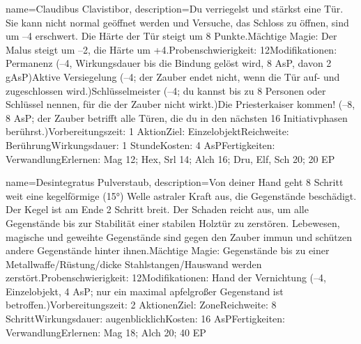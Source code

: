 {
    name={Claudibus Clavistibor},
    description={Du verriegelst und stärkst eine Tür. Sie kann nicht normal geöffnet werden und Versuche, das Schloss zu öffnen, sind um –4 erschwert. Die Härte der Tür steigt um 8 Punkte.\newline Mächtige Magie: Der Malus steigt um –2, die Härte um +4.\newline Probenschwierigkeit: 12\newline Modifikationen: Permanenz (–4, Wirkungsdauer bis die Bindung gelöst wird, 8 AsP, davon 2 gAsP)\newline Aktive Versiegelung (–4; der Zauber endet nicht, wenn die Tür auf- und zugeschlossen wird.)\newline Schlüsselmeister (–4; du kannst bis zu 8 Personen oder Schlüssel nennen, für die der Zauber nicht wirkt.)\newline Die Priesterkaiser kommen! (–8, 8 AsP; der Zauber betrifft alle Türen, die du in den nächsten 16 Initiativphasen berührst.)\newline Vorbereitungszeit: 1 Aktion\newline Ziel: Einzelobjekt\newline Reichweite: Berührung\newline Wirkungsdauer: 1 Stunde\newline Kosten: 4 AsP\newline Fertigkeiten: Verwandlung\newline Erlernen: Mag 12; Hex, Srl 14; Alch 16; Dru, Elf, Sch 20; 20 EP}
}


{
    name={Desintegratus Pulverstaub},
    description={Von deiner Hand geht 8 Schritt weit eine kegelförmige (15°) Welle astraler Kraft aus, die Gegenstände beschädigt. Der Kegel ist am Ende 2 Schritt breit. Der Schaden reicht aus, um alle Gegenstände bis zur Stabilität einer stabilen Holztür zu zerstören. Lebewesen, magische und geweihte Gegenstände sind gegen den Zauber immun und schützen andere Gegenstände hinter ihnen.\newline Mächtige Magie: Gegenstände bis zu einer Metallwaffe/Rüstung/dicke Stahlstangen/Hauswand werden zerstört.\newline Probenschwierigkeit: 12\newline Modifikationen: Hand der Vernichtung (–4, Einzelobjekt, 4 AsP; nur ein maximal apfelgroßer Gegenstand ist betroffen.)\newline Vorbereitungszeit: 2 Aktionen\newline Ziel: Zone\newline Reichweite: 8 Schritt\newline Wirkungsdauer: augenblicklich\newline Kosten: 16 AsP\newline Fertigkeiten: Verwandlung\newline Erlernen: Mag 18; Alch 20; 40 EP}
}


